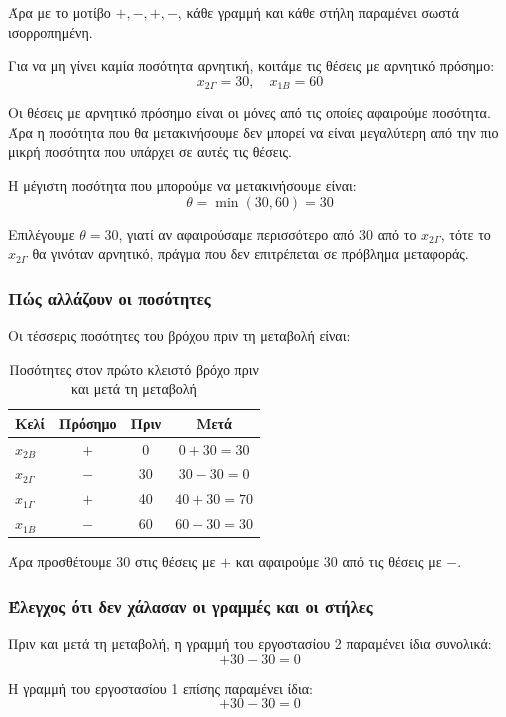 \documentclass[12pt,a4paper]{article}
\begin{document}
Άρα με το μοτίβο \(+,-,+,-\), κάθε γραμμή και κάθε στήλη παραμένει σωστά ισορροπημένη.

Για να μη γίνει καμία ποσότητα αρνητική, κοιτάμε τις θέσεις με αρνητικό πρόσημο:
\[
x_{2\Gamma}=30,\quad x_{1B}=60
\]

Οι θέσεις με αρνητικό πρόσημο είναι οι μόνες από τις οποίες αφαιρούμε ποσότητα. Άρα η ποσότητα που θα μετακινήσουμε δεν μπορεί να είναι μεγαλύτερη από την πιο μικρή ποσότητα που υπάρχει σε αυτές τις θέσεις.

Η μέγιστη ποσότητα που μπορούμε να μετακινήσουμε είναι:
\[
\theta=\min(30,60)=30
\]

Επιλέγουμε \(\theta=30\), γιατί αν αφαιρούσαμε περισσότερο από 30 από το \(x_{2\Gamma}\), τότε το \(x_{2\Gamma}\) θα γινόταν αρνητικό, πράγμα που δεν επιτρέπεται σε πρόβλημα μεταφοράς.

\subsubsection*{Πώς αλλάζουν οι ποσότητες}

Οι τέσσερις ποσότητες του βρόχου πριν τη μεταβολή είναι:

\begin{table}[H]
\centering
\caption{Ποσότητες στον πρώτο κλειστό βρόχο πριν και μετά τη μεταβολή}
\begin{tabular}{lccc}
\toprule
\textbf{Κελί} & \textbf{Πρόσημο} & \textbf{Πριν} & \textbf{Μετά} \\
\midrule
\(x_{2B}\) & \(+\) & 0 & \(0+30=30\) \\
\(x_{2\Gamma}\) & \(-\) & 30 & \(30-30=0\) \\
\(x_{1\Gamma}\) & \(+\) & 40 & \(40+30=70\) \\
\(x_{1B}\) & \(-\) & 60 & \(60-30=30\) \\
\bottomrule
\end{tabular}
\end{table}

Άρα προσθέτουμε 30 στις θέσεις με \(+\) και αφαιρούμε 30 από τις θέσεις με \(-\).

\subsubsection*{Έλεγχος ότι δεν χάλασαν οι γραμμές και οι στήλες}

Πριν και μετά τη μεταβολή, η γραμμή του εργοστασίου 2 παραμένει ίδια συνολικά:
\[
+30-30=0
\]

Η γραμμή του εργοστασίου 1 επίσης παραμένει ίδια:
\[
+30-30=0
\]
\end{document}
